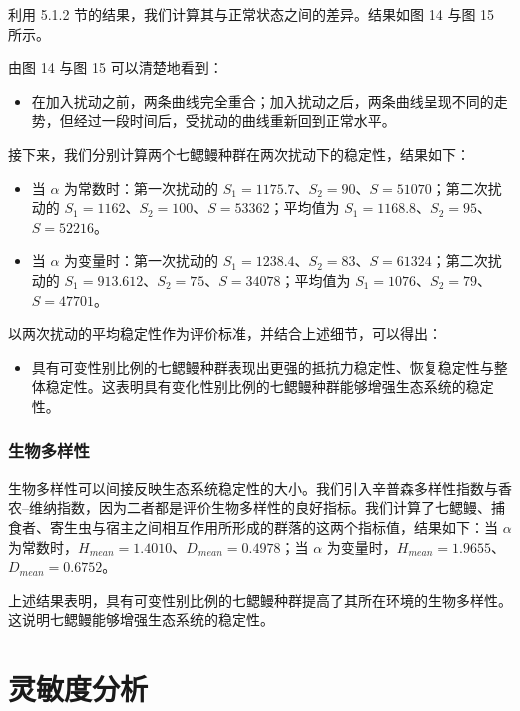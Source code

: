 \documentclass[11pt,a4paper]{ctexart}
\begin{document}
利用 5.1.2 节的结果，我们计算其与正常状态之间的差异。结果如图 14 与图 15 所示。

由图 14 与图 15 可以清楚地看到：

\begin{itemize}
\item 在加入扰动之前，两条曲线完全重合；加入扰动之后，两条曲线呈现不同的走势，但经过一段时间后，受扰动的曲线重新回到正常水平。
\end{itemize}

接下来，我们分别计算两个七鳃鳗种群在两次扰动下的稳定性，结果如下：

\begin{itemize}
\item 当 $\alpha$ 为常数时：第一次扰动的 $S_1=1175.7$、$S_2=90$、$S=51070$；第二次扰动的 $S_1=1162$、$S_2=100$、$S=53362$；平均值为 $S_1=1168.8$、$S_2=95$、$S=52216$。
\item 当 $\alpha$ 为变量时：第一次扰动的 $S_1=1238.4$、$S_2=83$、$S=61324$；第二次扰动的 $S_1=913.612$、$S_2=75$、$S=34078$；平均值为 $S_1=1076$、$S_2=79$、$S=47701$。
\end{itemize}

以两次扰动的平均稳定性作为评价标准，并结合上述细节，可以得出：

\begin{itemize}
\item 具有可变性别比例的七鳃鳗种群表现出更强的抵抗力稳定性、恢复稳定性与整体稳定性。这表明具有变化性别比例的七鳃鳗种群能够增强生态系统的稳定性。
\end{itemize}

\subsubsection{生物多样性}

生物多样性可以间接反映生态系统稳定性的大小。我们引入辛普森多样性指数与香农–维纳指数，因为二者都是评价生物多样性的良好指标。我们计算了七鳃鳗、捕食者、寄生虫与宿主之间相互作用所形成的群落的这两个指标值，结果如下：当 $\alpha$ 为常数时，$H_{mean}=1.4010$、$D_{mean}=0.4978$；当 $\alpha$ 为变量时，$H_{mean}=1.9655$、$D_{mean}=0.6752$。

上述结果表明，具有可变性别比例的七鳃鳗种群提高了其所在环境的生物多样性。这说明七鳃鳗能够增强生态系统的稳定性。

\section{灵敏度分析}
\end{document}
